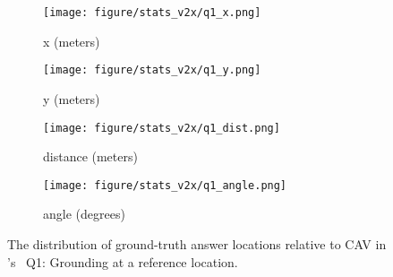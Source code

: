 \begin{figure}[!t]
        \centering
        \begin{subfigure}[t]{0.23\textwidth}
            \centering 
            \texttt{[image: figure/stats\_v2x/q1\_x.png]}
            \vspace{-20pt}
            \caption[]%
            {{x (meters)}}    
        \end{subfigure}
        \hfill
        \begin{subfigure}[t]{0.23\textwidth}  
            \centering 
            \texttt{[image: figure/stats\_v2x/q1\_y.png]}
            \vspace{-20pt}
            \caption[]%
            {{y (meters)}}
        \end{subfigure}

        \begin{subfigure}[t]{0.23\textwidth}
            \centering 
            \texttt{[image: figure/stats\_v2x/q1\_dist.png]}
            \vspace{-20pt}
            \caption[]%
            {{distance (meters)}}
        \end{subfigure}
        \hfill
        \begin{subfigure}[t]{0.23\textwidth}
            \centering 
            \texttt{[image: figure/stats\_v2x/q1\_angle.png]}
            \vspace{-20pt}
            \caption[]%
            {{angle (degrees)}}
        \end{subfigure}
        \hfill
        
        \vspace{-10pt}
        \caption[]
        {
        The distribution of ground-truth answer locations relative to CAV in \namedataset's \namexsplit~Q1: Grounding at a reference location. 
        } 
        \label{fig:stats_v2x_q1}
        \vspace{-10pt}
\end{figure}



